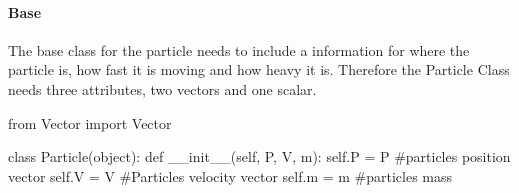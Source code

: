 \documentclass[15pt]{report}
\begin{document}
\paragraph{Base} The base class for the particle needs to include a information for where the particle is, how fast it is moving and how heavy it is. Therefore the Particle Class needs three attributes, two vectors and one scalar.

\begin{code}
from Vector import Vector

class Particle(object):
    def __init__(self, P, V, m):
        self.P = P        #particles position vector
        self.V = V        #Particles velocity vector
        self.m = m        #particles mass
\end{code}

\printbibliography
\end{document}

